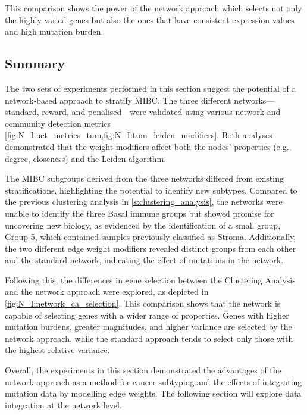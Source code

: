 This comparison shows the power of the network approach which selects not only the highly varied genes but also the ones that have consistent expression values and high mutation burden.

\subsection{Summary}

The two sets of experiments performed in this section suggest the potential of a network-based approach to stratify MIBC. The three different networks—standard, reward, and penalised—were validated using various network and community detection metrics \cref{fig:N_I:net_metrics_tum,fig:N_I:tum_leiden_modifiers}. Both analyses demonstrated that the weight modifiers affect both the nodes' properties (e.g., degree, closeness) and the Leiden algorithm.

The MIBC subgroups derived from the three networks differed from existing stratifications, highlighting the potential to identify new subtypes. Compared to the previous clustering analysis in \cref{s:clustering_analysis}, the networks were unable to identify the three Basal immune groups but showed promise for uncovering new biology, as evidenced by the identification of a small group, Group 5, which contained samples previously classified as Stroma. Additionally, the two different edge weight modifiers revealed distinct groups from each other and the standard network, indicating the effect of mutations in the network.

Following this, the differences in gene selection between the Clustering Analysis and the network approach were explored, as depicted in \cref{fig:N_I:network_ca_selection}. This comparison shows that the network is capable of selecting genes with a wider range of properties. Genes with higher mutation burdens, greater magnitudes, and higher variance are selected by the network approach, while the standard approach tends to select only those with the highest relative variance.

Overall, the experiments in this section demonstrated the advantages of the network approach as a method for cancer subtyping and the effects of integrating mutation data by modelling edge weights. The following section will explore data integration at the network level.
